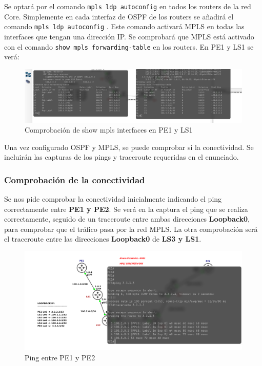 \documentclass{article}
\begin{document}
Se optará por el comando \texttt{mpls ldp autoconfig} en todos los routers de la red Core. Simplemente en cada interfaz de OSPF de los routers se añadirá el comando \texttt{mpls ldp autoconfig} .
Este comando activará MPLS en todas las interfaces que tengan una dirección IP. Se comprobará que MPLS está activado con el comando \texttt{show mpls forwarding-table} en los routers. En PE1 y LS1 se verá:

\begin{figure}[h]
    \centering
    \includegraphics[width=1\textwidth]{src/showipmpls.png}
    \caption{Comprobación de show mpls interfaces en PE1 y LS1}
\end{figure}

Una vez configurado OSPF y MPLS, se puede comprobar si la conectividad. Se incluirán las capturas de los pings y traceroute requeridas en el enunciado.

\subsubsection{Comprobación de la conectividad}

Se nos pide comprobar la conectividad inicialmente indicando el ping correctamente entre \textbf{PE1 y PE2}. Se verá en la captura el ping que se realiza correctamente, seguido de un traceroute entre ambas direcciones \textbf{Loopback0}, para comprobar que el tráfico pasa por la red MPLS.
La otra comprobación será el traceroute entre las direcciones \textbf{Loopback0} de \textbf{LS3 y LS1}.

\begin{figure}[h]
    \centering
    \includegraphics[width=1\textwidth]{src/pingpe1pe2.png}
    \caption{Ping entre PE1 y PE2}
\end{figure}
\end{document}
